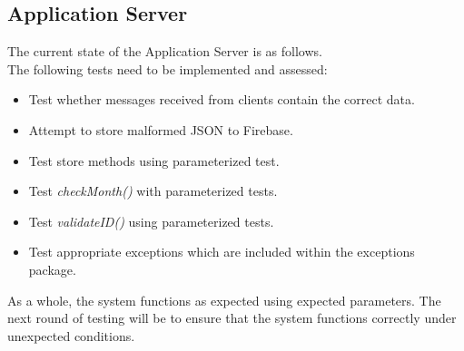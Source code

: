 \documentclass[a4paper,10pt]{article}
\begin{document}
		\subsection{Application Server}
		The current state of the Application Server is as follows.
		\\The following tests need to be implemented and assessed:
			\begin{itemize}
				\item Test whether messages received from clients contain the correct data.
				\item Attempt to store malformed JSON to Firebase.
				\item Test store methods using parameterized test.
				\item Test \textit{checkMonth()} with parameterized tests.
				\item Test \textit{validateID()} using parameterized tests.
				\item Test appropriate exceptions which are included within the exceptions package.
			\end{itemize}
			
		As a whole, the system functions as expected using expected parameters.
		The next round of testing will be to ensure that the system functions correctly under unexpected conditions.
\end{document}
